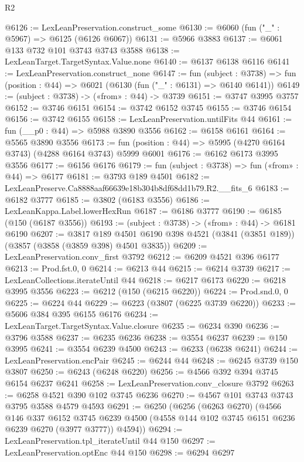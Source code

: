\begin{lexlean}{R2}
\begin{coremodule}
@6126 := LexLeanPreservation.construct_some
@6130 := @6060 (fun ("_" : @5967) => @6125 (@6126 @6067))
@6131 := @5966 @3883
@6137 := @6061 @133 @732 @101 @3743 @3743 @3588
@6138 := LexLeanTarget.TargetSyntax.Value.none
@6140 := @6137 @6138 @6116
@6141 := LexLeanPreservation.construct_none
@6147 := fun (subject : @3738) =>
  fun (position : @44) => @6021 (@6130 (fun ("_" : @6131) => @6140 @6141))
@6149 := (subject : @3738) -> («from» : @44) -> @3739
@6151 := @3747 @3995 @3757
@6152 := @3746 @6151
@6154 := @3742 @6152 @3745
@6155 := @3746 @6154
@6156 := @3742 @6155
@6158 := LexLeanPreservation.untilFits @44
@6161 := fun (__p0 : @44) => @5988 @3890 @3556
@6162 := @6158 @6161
@6164 := @5565 @3890 @3556
@6173 := fun (position : @44) => @5995 (@4270 @6164 @3743) (@4288 @6164 @3743) @5999 @6001
@6176 := @6162 @6173 @3995 @3556
@6177 := @6156 @6176
@6179 := fun (subject : @3738) => fun («from» : @44) => @6177
@6181 := @3793 @189 @4501
@6182 := LexLeanPreserve.Ca8888aaf66639e18b304b8df68dd1b79.R2.__fits_6
@6183 := @6182 @3777
@6185 := @3802 (@6183 @3556)
@6186 := LexLeanKappa.Label.lowerHexRun
@6187 := @6186 @3777
@6190 := @6185 (@150 (@6187 @3556))
@6193 := (subject : @3738) -> («from» : @44) -> @6181 @6190
@6207 := @3817
    @189
    @4501
    @6190
    @398
    @4521
    (@3841 (@3851 @189))
    (@3857 (@3858 (@3859 @398) @4501 @3835))
@6209 := LexLeanPreservation.conv_first @3792
@6212 := @6209 @4521 @396 @6177
@6213 := Prod.fst.{0, 0}
@6214 := @6213 @44
@6215 := @6214 @3739
@6217 := LexLeanCollections.iterateUntil @44
@6218 := @6217 @6173
@6220 := @6218 @3995 @3556
@6223 := @6212 (@150 (@6215 @6220))
@6224 := Prod.snd.{0, 0}
@6225 := @6224 @44
@6229 := @6223 (@3807 (@6225 @3739 @6220))
@6233 := @5606 @384 @395 @6155 @6176
@6234 := LexLeanTarget.TargetSyntax.Value.closure
@6235 := @6234 @390
@6236 := @3796 @3588
@6237 := @6235 @6236
@6238 := @3554 @6237
@6239 := @150 @3995
@6241 := @3554 @6239 @4500
@6243 := @6233 (@6238 @6241)
@6244 := LexLeanPreservation.encPair
@6245 := @6244 @44
@6248 := @6245 @3739 @150 @3807
@6250 := @6243 (@6248 @6220)
@6256 := @4566 @392 @394 @3745 @6154 @6237 @6241
@6258 := LexLeanPreservation.conv_closure @3792
@6263 := @6258 @4521 @390 @102 @3745 @6236
@6270 := @4567 @101 @3743 @3743 @3795 @3588 @4579 @4593
@6291 := @6250
    (@6256
      (@6263 @6270)
      (@4566
        @146
        @337
        @6152
        @3745
        @6239
        @4500
        (@4558 @144 @102 @3745 @6151 @6236 @6239 @6270 (@3977 @3777))
        @4594))
@6294 := LexLeanPreservation.tpl_iterateUntil @44 @150
@6297 := LexLeanPreservation.optEnc @44 @150
@6298 := @6294 @6297

\end{coremodule}
\end{lexlean}
